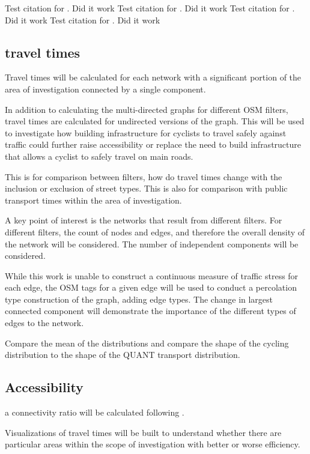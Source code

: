 Test citation for \cite{osmnx}. Did it work
Test citation for \cite{networkx}. Did it work
Test citation for \cite{qgis}. Did it work
Test citation for \cite{python}. Did it work
\subsection{travel times}

Travel times will be calculated for each network with a significant portion of the area of investigation connected by a single component.

In addition to calculating the multi-directed graphs for different OSM filters, travel times are calculated for undirected versions of the graph. This will be used to investigate how building infrastructure for cyclists to travel safely against traffic could further raise accessibility or replace the need to build infrastructure that allows a cyclist to safely travel on main roads. 

 This is for comparison between filters, how do travel times change with the inclusion or exclusion of street types. This is also for comparison with public transport times within the area of investigation. 

A key point of interest is the networks that result from different filters. For different filters, the count of nodes and edges, and therefore the overall density of the network will be considered. The number of independent components will be considered. 

While this work is unable to construct a continuous measure of traffic stress for each edge, the OSM tags for a given edge will be used to conduct a percolation type construction of the graph, adding edge types. The change in largest connected component will demonstrate the importance of the different types of edges to the network. 

Compare the mean of the distributions and compare the shape of the cycling distribution to the shape of the QUANT transport distribution. 


\subsection{Accessibility}

a connectivity ratio will be calculated following \cite{furth}. 

Visualizations of travel times will be built to understand whether there are particular areas within the scope of investigation with better or worse efficiency. 
